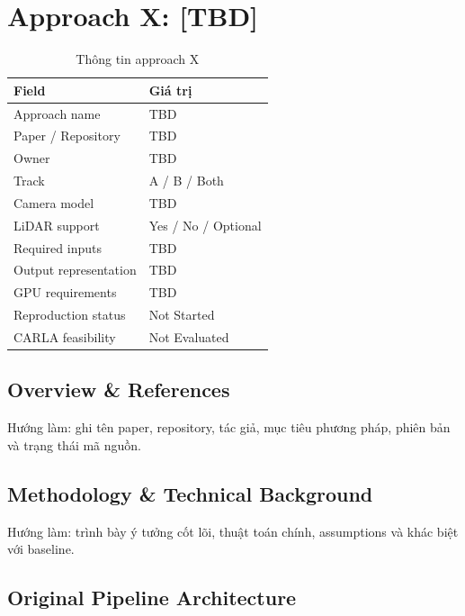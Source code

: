 \chapter{Approach X: [TBD]}

\begin{table}[H]
  \centering
  \caption{Thông tin approach X}
  \begin{tabularx}{\linewidth}{l X}
    \toprule
    \textbf{Field} & \textbf{Giá trị} \\
    \midrule
    Approach name & TBD \\
    Paper / Repository & TBD \\
    Owner & TBD \\
    Track & A / B / Both \\
    Camera model & TBD \\
    LiDAR support & Yes / No / Optional \\
    Required inputs & TBD \\
    Output representation & TBD \\
    GPU requirements & TBD \\
    Reproduction status & Not Started \\
    CARLA feasibility & Not Evaluated \\
    \bottomrule
  \end{tabularx}
\end{table}

\section{Overview \& References}

Hướng làm: ghi tên paper, repository, tác giả, mục tiêu phương pháp, phiên bản và trạng thái mã nguồn.

\section{Methodology \& Technical Background}

Hướng làm: trình bày ý tưởng cốt lõi, thuật toán chính, assumptions và khác biệt với baseline.

\section{Original Pipeline Architecture}

